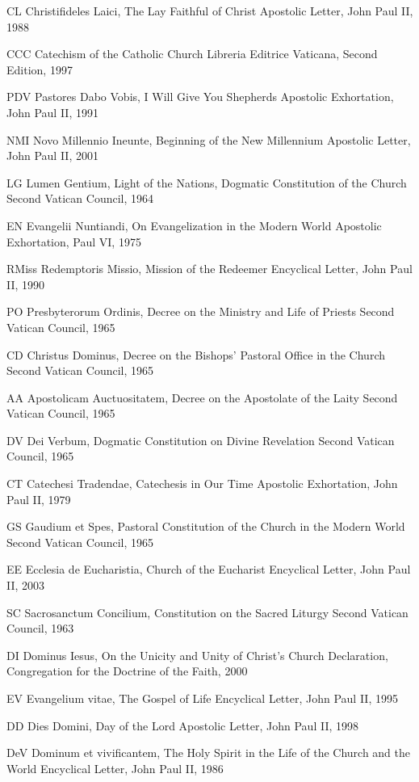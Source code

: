 \documentclass[oneside]{book}
\begin{document}
CL    Christifideles Laici, The Lay Faithful of Christ
    Apostolic Letter, John Paul II, 1988

CCC    Catechism of the Catholic Church
    Libreria Editrice Vaticana, Second Edition, 1997

PDV    Pastores Dabo Vobis, I Will Give You Shepherds
    Apostolic Exhortation, John Paul II, 1991

NMI    Novo Millennio Ineunte, Beginning of the New Millennium
    Apostolic Letter, John Paul II, 2001

LG    Lumen Gentium, Light of the Nations,
    Dogmatic Constitution of the Church
    Second Vatican Council, 1964

EN    Evangelii Nuntiandi, On Evangelization in the Modern World
    Apostolic Exhortation, Paul VI, 1975

RMiss    Redemptoris Missio, Mission of the Redeemer
    Encyclical Letter, John Paul II, 1990

PO    Presbyterorum Ordinis, Decree on the Ministry and Life of Priests
    Second Vatican Council, 1965

CD    Christus Dominus, Decree on the Bishops' Pastoral Office
      in the Church
    Second Vatican Council, 1965

AA    Apostolicam Auctuositatem, Decree on the Apostolate of the Laity
    Second Vatican Council, 1965


DV    Dei Verbum, Dogmatic Constitution on Divine Revelation
    Second Vatican Council, 1965

CT    Catechesi Tradendae, Catechesis in Our Time
    Apostolic Exhortation, John Paul II, 1979

GS    Gaudium et Spes, Pastoral Constitution of the Church
      in the Modern World
    Second Vatican Council, 1965

EE    Ecclesia de Eucharistia, Church of the Eucharist
    Encyclical Letter, John Paul II, 2003

SC    Sacrosanctum Concilium, Constitution on the Sacred Liturgy
    Second Vatican Council, 1963

DI    Dominus Iesus, On the Unicity and Unity of Christ's Church
    Declaration, Congregation for the Doctrine of the Faith, 2000

EV    Evangelium vitae, The Gospel of Life
    Encyclical Letter, John Paul II, 1995

DD    Dies Domini, Day of the Lord
    Apostolic Letter, John Paul II, 1998

DeV    Dominum et vivificantem, The Holy Spirit in the Life of
      the Church and the World
    Encyclical Letter, John Paul II, 1986
\end{document}
